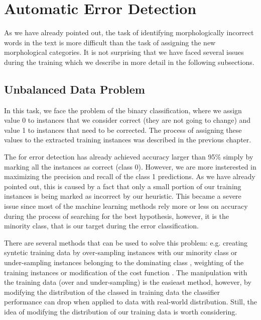\section{Automatic Error Detection}


As we have already pointed out, 
the task of identifying morphologically incorrect words in the text is more difficult
than the task of assigning the new morphological categories. It is not surprising
that we have faced several issues
during the training which we describe in more detail in the following subsections.



\subsection{Unbalanced Data Problem}

In this task, we face the problem of the binary classification, where we
assign value 0 to instances that we consider correct (they are not going to change) and value 1 to
instances that need to be corrected. The process of assigning these values to the
extracted training instances was described in the previous chapter. 

The  for error detection has already achieved accuracy larger than 95\%
simply by marking all the instances as correct (class 0). However, we are more insterested
in maximizing the precision and recall of the class 1 predictions.
As we have already pointed out, this is caused by a fact that only a small portion of our
training instances is being marked as incorrect by our heuristic.
This became a severe issue since most of the machine learning methods rely more or less on accuracy during
the process of searching for the best hypothesis, however, it is the minority
class, that is our target during the error classification.

There are several methods that can be used to solve this problem: e.g. creating syntetic
training data by over-sampling instances with our minority class or under-sampling instances
belonging to the dominating class \citep{Batista:2004:SBS:1007730.1007735}, weighting of the training instances or modification of the
cost function \citep{Domingos:1999:MGM:312129.312220}. The manipulation with the training data (over and under-sampling) is the easieast method,
however,
by modifying the distribution of the classed in training data the classifier performance
can drop when applied to data with real-world distribution.
Still, the idea of modifying the distribution of our training data is worth considering.

